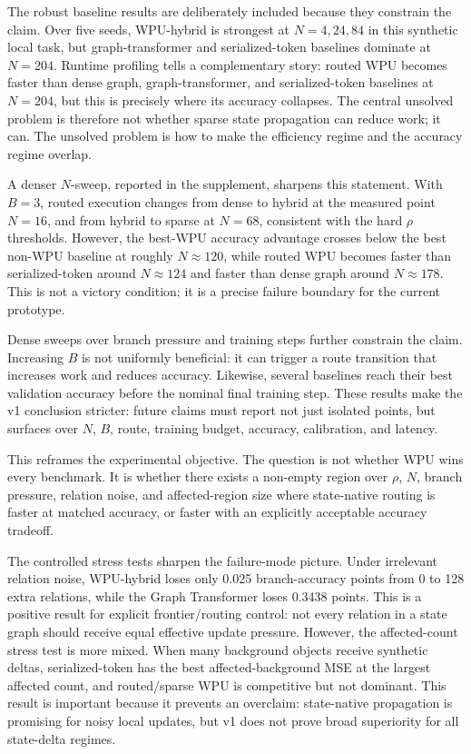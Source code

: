 \documentclass[11pt]{article}
\begin{document}
The robust baseline results are deliberately included because they constrain
the claim. Over five seeds, WPU-hybrid is strongest at \(N=4,24,84\) in this
synthetic local task, but graph-transformer and serialized-token baselines
dominate at \(N=204\). Runtime profiling tells a complementary story: routed
WPU becomes faster than dense graph, graph-transformer, and serialized-token
baselines at \(N=204\), but this is precisely where its accuracy collapses. The
central unsolved problem is therefore not whether sparse state propagation can
reduce work; it can. The unsolved problem is how to make the efficiency regime
and the accuracy regime overlap.

A denser \(N\)-sweep, reported in the supplement, sharpens this statement. With \(B=3\), routed execution
changes from dense to hybrid at the measured point \(N=16\), and from hybrid to
sparse at \(N=68\), consistent with the hard \(\rho\) thresholds. However, the
best-WPU accuracy advantage crosses below the best non-WPU baseline at roughly
\(N\approx120\), while routed WPU becomes faster than serialized-token around
\(N\approx124\) and faster than dense graph around \(N\approx178\). This is not
a victory condition; it is a precise failure boundary for the current
prototype.

Dense sweeps over branch pressure and training steps further constrain the
claim. Increasing \(B\) is not uniformly beneficial: it can trigger a route
transition that increases work and reduces accuracy. Likewise, several
baselines reach their best validation accuracy before the nominal final
training step. These results make the v1 conclusion stricter: future claims
must report not just isolated points, but surfaces over \(N\), \(B\), route,
training budget, accuracy, calibration, and latency.

This reframes the experimental objective. The question is not whether WPU wins
every benchmark. It is whether there exists a non-empty region over \(\rho\),
\(N\), branch pressure, relation noise, and affected-region size where
state-native routing is faster at matched accuracy, or faster with an explicitly
acceptable accuracy tradeoff.

The controlled stress tests sharpen the failure-mode picture. Under irrelevant
relation noise, WPU-hybrid loses only 0.025 branch-accuracy points from 0 to 128
extra relations, while the Graph Transformer loses 0.3438 points. This is a
positive result for explicit frontier/routing control: not every relation in a
state graph should receive equal effective update pressure. However, the
affected-count stress test is more mixed. When many background objects receive
synthetic deltas, serialized-token has the best affected-background MSE at the
largest affected count, and routed/sparse WPU is competitive but not dominant.
This result is important because it prevents an overclaim: state-native
propagation is promising for noisy local updates, but v1 does not prove broad
superiority for all state-delta regimes.
\end{document}
